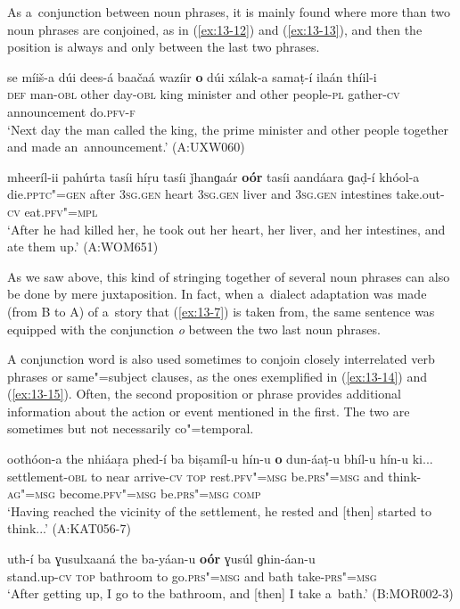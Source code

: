As a~conjunction between noun phrases, it is mainly found where more than two noun phrases are conjoined, as in (\ref{ex:13-12}) and (\ref{ex:13-13}), and then the position is always and only between the last two phrases.

\ea
\label{ex:13-12}
\gll se míiš-a dúi dees-á {\ob}baačaá wazíir \textbf{o} dúi xálak-a{\cb} samaṭ-í ilaán thíil-i \\
\textsc{def} man-\textsc{obl} other day-\textsc{obl} king minister and other  people-\textsc{pl} gather-\textsc{cv} announcement do.\textsc{pfv-f}  \\
\glt `Next day the man called the king, the prime minister and other people together and made an~announcement.' (A:UXW060)

\ex
\label{ex:13-13}
\gll mheeríl-ii pahúrta {\ob}tasíi híṛu tasíi ǰhanɡaár \textbf{oór} tasíi aandáara{\cb} ɡaḍ-í khóol-a\\
die.\textsc{pptc"=gen} after \textsc{3sg.gen} heart \textsc{3sg.gen}  liver and \textsc{3sg.gen} intestines take.out-\textsc{cv} eat.\textsc{pfv"=mpl}\\
\glt `After he had killed her, he took out her heart, her liver, and her intestines, and ate them up.' (A:WOM651) 
\z

As we saw above, this kind of stringing together of several noun phrases can also be done by mere juxtaposition. In fact, when a~dialect adaptation was made (from B to A) of a~story that (\ref{ex:13-7}) is taken from, the same sentence was equipped with the conjunction \textit{o} between the two last noun phrases. 


A conjunction word is also used sometimes to conjoin closely interrelated verb phrases or same"=subject clauses, as the ones exemplified in (\ref{ex:13-14}) and (\ref{ex:13-15}). Often, the second proposition or phrase provides additional information about the action or event mentioned in the first. The two are sometimes but not necessarily co"=temporal.

\begin{exe}
\ex
\label{ex:13-14}
\gll oothóon-a the nhiáaṛa phed-í ba {\ob}biṣamíl-u hín-u \textbf{o} dun-áaṭ-u bhíl-u hín-u{\cb} ki...\\
settlement-\textsc{obl} to near arrive-\textsc{cv} \textsc{top} rest.\textsc{pfv"=msg} be.\textsc{prs"=msg} and think-\textsc{ag"=msg} become.\textsc{pfv"=msg} be.\textsc{prs"=msg } \textsc{comp} \\
\glt `Having reached the vicinity of the settlement, he rested and [then] started to think...' (A:KAT056-7)

\ex
\label{ex:13-15}
\gll uth-í ba {\ob}ɣusulxaaná the ba-yáan-u \textbf{oór} ɣusúl ɡhin-áan-u{\cb} \\
stand.up-\textsc{cv} \textsc{top} bathroom to go.\textsc{prs"=msg}  and bath take-\textsc{prs"=msg} \\
\glt `After getting up, I go to the bathroom, and [then] I take a~bath.' (B:MOR002-3) 
\end{exe}

